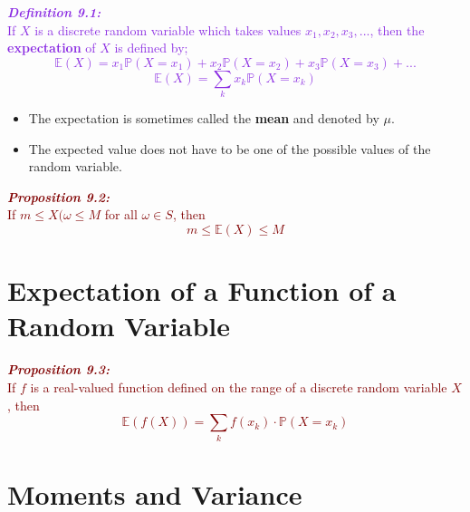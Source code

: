 \documentclass{report}
\newenvironment{cframed}[1][BlueViolet]
  {\begin{tcolorbox}[colframe=#1,colback=white]}
  {\end{tcolorbox}}
\newenvironment{cframedprop}[1][Maroon]
  {\begin{tcolorbox}[colframe=#1,colback=white]}
  {\end{tcolorbox}}
\begin{document}
\begin{cframed}
    \textcolor{BlueViolet}{\textbf{\textit{Definition 9.1:}}\\
    If $X$ is a discrete random variable which takes values $x_1,x_2,x_3,...$, then the \textbf{expectation} of $X$ is defined by;
    \begin{equation*}
        \mathbb{E}(X) = x_1\mathbb{P}(X = x_1) + x_2\mathbb{P}(X = x_2) + x_3\mathbb{P}(X = x_3) + ...
    \end{equation*}
    \begin{equation}
        \mathbb{E}(X) = \sum_k x_k\mathbb{P}(X = x_k)
    \end{equation}}
\end{cframed}
\begin{itemize}
    \item The expectation is sometimes called the \textbf{mean} and denoted by $\mu$.
    \item The expected value does not have to be one of the possible values of the random variable.
\end{itemize}

\begin{cframedprop}
    \textcolor{Maroon}{\textbf{\textit{Proposition 9.2:}}\\
    If $m \leq X(\omega \leq M$ for all $\omega \in S$, then
    \begin{equation}
        m \leq \mathbb{E}(X) \leq M
    \end{equation}}
\end{cframedprop}

\section{Expectation of a Function of a Random Variable}

\begin{cframedprop}
    \textcolor{Maroon}{\textbf{\textit{Proposition 9.3:}}\\
    If $f$ is a real-valued function defined on the range of a discrete random variable $X$, then
    \begin{equation}
        \mathbb{E}(f(X)) = \sum_k f(x_k)\cdot \mathbb{P}(X = x_k)
    \end{equation}}
\end{cframedprop}

\section{Moments and Variance}
\end{document}
